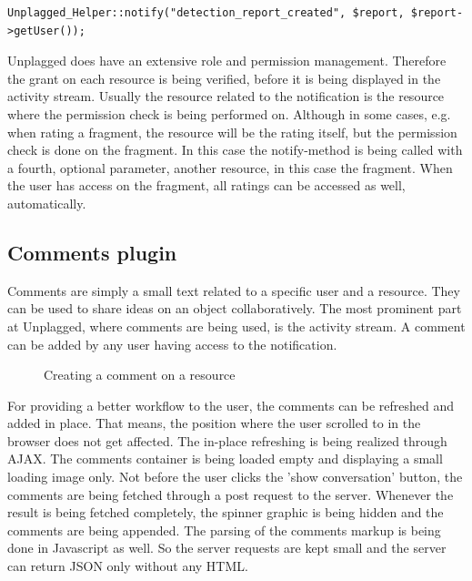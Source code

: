 \begin{lstlisting}[caption=Creating a notification for a created report]
Unplagged_Helper::notify("detection_report_created", $report, $report->getUser());
\end{lstlisting}

Unplagged does have an extensive role and permission management. Therefore the grant on each resource is being verified, before it is being displayed in the activity stream. Usually the resource related to the notification is the resource where the permission check is being performed on. Although in some cases, e.g. when rating a fragment, the resource will be the rating itself, but the permission check is done on the fragment. In this case the notify-method is being called with a fourth, optional parameter, another resource, in this case the fragment. When the user has access on the fragment, all ratings can be accessed as well, automatically.

\subsection{Comments plugin}

Comments are simply a small text related to a specific user and a resource. They can be used to share ideas on an object collaboratively. The most prominent part at Unplagged, where comments are being used, is the activity stream. A comment can be added by any user having access to the notification. 

\begin{figure}[!h]
  \centering
  \caption{Creating a comment on a resource}
  \label{fig:creating-a-comment}
\end{figure}

For providing a better workflow to the user, the comments can be refreshed and added in place. That means, the position where the user scrolled to in the browser does not get affected. The in-place refreshing is being realized through AJAX. The comments container is being loaded empty and displaying a small loading image only. Not before the user clicks the 'show conversation' button, the comments are being fetched through a post request to the server. Whenever the result is being fetched completely, the spinner graphic is being hidden and the comments are being appended. The parsing of the comments markup is being done in Javascript as well. So the server requests are kept small and the server can return JSON only without any HTML.

